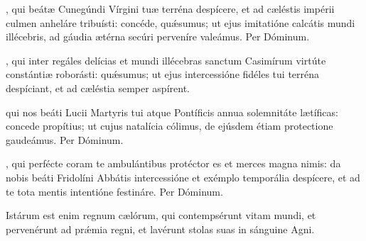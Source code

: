 \documentclass[fontsize=9pt,paper=A6,twoside,BCOR=1mm,DIV=22,headinclude]{scrarticle}
\renewcommand\A\Ant
\begin{document}
\begin{multicols}{2}
{\RVVvi 


}


\VRVii 

\BV 

, qui beátæ Cunegúndi Vírgini tuæ terréna despícere, et ad cæléstis impérii culmen anheláre tribuísti: concéde, qu\'æsumus; ut ejus imitatióne calcátis mundi illécebris, ad gáudia ætérna secúri perveníre valeámus. Per Dóminum.



\VRVii 

\MiiV 


\AiC 

\VRCi 

, qui inter regáles delícias et mundi illécebras sanctum Casimírum virtúte constántiæ roborásti: quǽsumus; ut ejus intercessióne fidéles tui terréna despíciant, et ad cæléstia semper aspírent.


\AiM 

\VRMi 

 qui nos beáti Lucii Martyris tui atque Pontíficis annua solemnitáte lætíficas: concede propítius; ut cujus natalícia cólimus, de ejúsdem étiam protectione gaudeámus. Per Dóminum.




{

\VRCi 

\MiC 

, qui perfécte coram te ambulántibus protéctor es et merces magna nimis: da nobis beáti Fridolíni Abbátis intercessióne et exémplo temporália despícere, et ad te tota mentis intentióne festináre. Per Dóminum.


\A Istárum est enim regnum cælórum, qui contempsérunt vitam mundi, et pervenérunt ad prǽmia regni, et lavérunt stolas suas in sánguine Agni.

}
\end{multicols}
\end{document}
